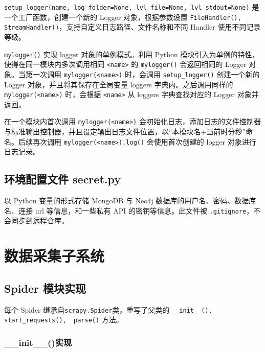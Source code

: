 \documentclass[a4paper,AutoFakeBold,oneside,12pt]{book}
\begin{document}
\lstinline|setup_logger(name, log_folder=None, lvl_file=None, lvl_stdout=None)| 是一个工厂函数，创建一个新的 Logger 对象，根据参数设置 \lstinline|FileHandler(), StreamHandler()|，支持自定义日志路径、文件名称和不同 Handler 使用不同记录等级。

\lstinline[style = python]|mylogger()| 实现 logger 对象的单例模式\cite{singleton_design_pattern}。利用 Python 模块引入为单例的特性，使得在同一模块内多次调用相同 \lstinline[style = python]|<name>| 的 \lstinline[style = python]|mylogger()| 会返回相同的 Logger 对象。当第一次调用 \lstinline|mylogger(<name>)| 时，会调用 \lstinline|setup_logger()| 创建一个新的 Logger 对象，并且将其保存在全局变量 loggers 字典内。之后调用同样的 \lstinline|mylogger(<name>)| 时，会根据 \lstinline|<name>| 从 loggers 字典查找对应的 Logger 对象并返回。

在一个模块内首次调用 \lstinline[style = python]|mylogger(<name>)| 会初始化日志，添加日志的文件控制器与标准输出控制器，并且设定输出日志文件位置，以“本模块名+当前时分秒”命名。后续再次调用 \lstinline[style = python]|mylogger(<name>).log()| 会使用首次创建的 logger 对象进行日志记录。

\subsection{环境配置文件 secret.py}

以 Python 变量的形式存储 MongoDB 与 Neo4j 数据库的用户名、密码、数据库名、连接 url 等信息，和一些私有 API 的密钥等信息。此文件被 \lstinline|.gitignore|，不会同步到远程仓库。

\section{数据采集子系统}

\subsection{Spider 模块实现}

每个 Spider 继承自\lstinline[style = python]|scrapy.Spider|类，重写了父类的 \lstinline[style = python]|__init__(), start_requests(),  parse()| 方法。

\subsubsection{{\_\_}init{\_\_}()实现}
\end{document}
